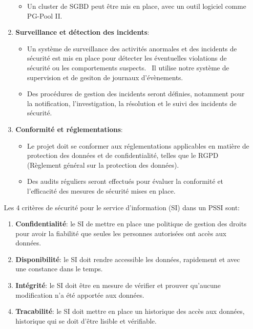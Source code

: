\documentclass[a4paper, 11pt]{report}
\begin{document}
\begin{enumerate}
\begin{itemize}
        \item Un cluster de SGBD peut être mis en place, avec un outil logiciel comme PG-Pool II.
      \end{itemize}
    \item \textbf{Surveillance et détection des incidents}:
      \begin{itemize}
        \item Un système de surveillance des activités anormales et des incidents de sécurité est mis en place pour détecter les éventuelles violations de sécurité ou les comportements suspects. \
          Il utilise notre système de supervision et de gesiton de journaux d'évènements.
        \item Des procédures de gestion des incidents seront définies, notamment pour la notification, l'investigation, la résolution et le suivi des incidents de sécurité.
      \end{itemize}
    \item \textbf{Conformité et réglementations}:
      \begin{itemize}
        \item Le projet doit se conformer aux réglementations applicables en matière de protection des données et de confidentialité, telles que le RGPD (Règlement général sur la protection des données).
        \item Des audits réguliers seront effectués pour évaluer la conformité et l'efficacité des mesures de sécurité mises en place.
      \end{itemize}
  \end{enumerate}
  Les 4 critères de sécurité pour le service d'information (SI) dans un PSSI sont:
  \begin{enumerate}
    \item \textbf{Confidentialité}: le SI de mettre en place une politique de gestion des droits pour avoir la fiabilité que seules les personnes autorisées ont accès aux données.
    \item \textbf{Disponibilité}: le SI doit rendre accessible les données, rapidement et avec une constance dans le temps.
    \item \textbf{Intégrité}: le SI doit être en mesure de vérifier et prouver qu'aucune modification n'a été apportée aux données.
    \item \textbf{Tracabilité}: le SI doit mettre en place un historique des accès aux données, historique qui se doit d'être lisible et vérifiable.
  \end{enumerate}
\end{document}
